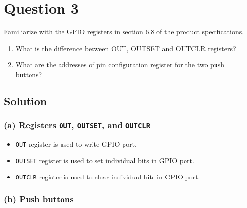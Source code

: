 \section*{Question 3}

Familiarize with the GPIO registers in section 6.8 of the product specifications.
\begin{enumerate}[label= (\alph*)]
    \item What is the diﬀerence between OUT, OUTSET and OUTCLR registers?
    \item What are the addresses of pin configuration register for the two push buttons?
\end{enumerate}

\subsection*{Solution}

\subsubsection*{(a) Registers \texttt{OUT}, \texttt{OUTSET}, and \texttt{OUTCLR}}

\begin{itemize}
    \item \texttt{OUT} register is used to write GPIO port.
    \item \texttt{OUTSET} register is used to set individual bits in GPIO port.
    \item \texttt{OUTCLR} register is used to clear individual bits in GPIO port.
\end{itemize}

\subsubsection*{(b) Push buttons}
